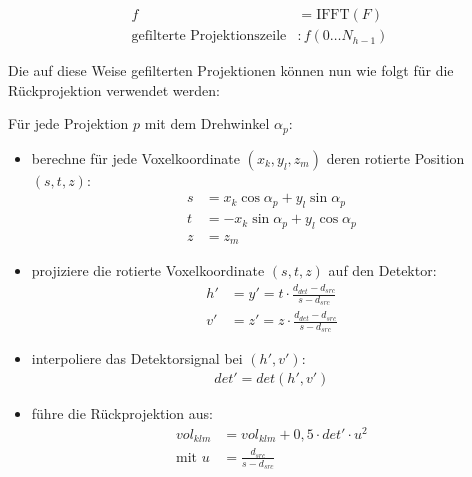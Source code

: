 \begin{equation}
    \begin{aligned}
        f &= \text{IFFT}(F)\\
        \text{gefilterte Projektionszeile} &: f(0 \dots N_{h - 1})
    \end{aligned}
\end{equation}

Die auf diese Weise gefilterten Projektionen können nun wie folgt für die Rückprojektion verwendet werden:

Für jede Projektion $p$ mit dem Drehwinkel $\alpha_p$:

\begin{itemize}
    \item berechne für jede Voxelkoordinate $(x_k, y_l, z_m)$ deren rotierte Position $(s, t, z)$:
        \begin{equation}
            \begin{aligned}
                s &= x_k \cos \alpha_p + y_l \sin \alpha_p\\
                t &= -x_k \sin \alpha_p + y_l \cos \alpha_p\\
                z &= z_m
            \end{aligned}
        \end{equation}

    \item projiziere die rotierte Voxelkoordinate $(s, t, z)$ auf den Detektor:
        \begin{equation}
            \begin{aligned}
                h' &= y' = t \cdot \frac{d_{det} - d_{src}}{s - d_{src}}\\
                v' &= z' = z \cdot \frac{d_{det} - d_{src}}{s - d_{src}}
            \end{aligned}
        \end{equation}

    \item interpoliere das Detektorsignal bei $(h', v')$:
        \begin{equation}
            \begin{aligned}
                det' = det(h', v')
            \end{aligned}
        \end{equation}

    \item führe die Rückprojektion aus:
        \begin{equation}
            \begin{aligned}
                vol_{klm} &= vol_{klm} + 0,5 \cdot det' \cdot u^2\\
                \text{mit } u &= \frac{d_{src}}{s - d_{src}}
            \end{aligned}
        \end{equation}
\end{itemize}

